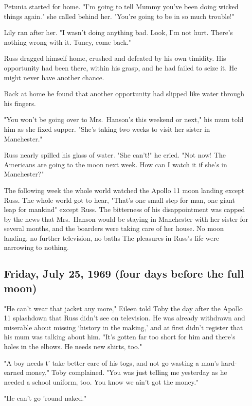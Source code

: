 Petunia started for home. "I'm going to tell Mummy you've been doing wicked things again." she called behind her. "You're going to be in so much trouble!"

Lily ran after her. "I wasn't doing anything bad. Look, I'm not hurt. There's nothing wrong with it. Tuney, come back."

Russ dragged himself home, crushed and defeated by his own timidity. His opportunity had been there, within his grasp, and he had failed to seize it. He might never have another chance.

Back at home he found that another opportunity had slipped like water through his fingers.

"You won't be going over to Mrs.~Hanson's this weekend or next," his mum told him as she fixed supper. "She's taking two weeks to visit her sister in Manchester."

Russ nearly spilled his glass of water. "She can't!" he cried. "Not now! The Americans are going to the moon next week. How can I watch it if she's in Manchester?"

The following week the whole world watched the Apollo 11 moon landing except Russ. The whole world got to hear, "That's one small step for man, one giant leap for mankind" except Russ. The bitterness of his disappointment was capped by the news that Mrs.~Hanson would be staying in Manchester with her sister for several months, and the boarders were taking care of her house. No moon landing, no further television, no baths{\el} The pleasures in Russ's life were narrowing to nothing.

\subsection{Friday, July 25, 1969 (four days before the full moon)}

"He can't wear that jacket any more," Eileen told Toby the day after the Apollo 11 splashdown that Russ didn't see on television. He was already withdrawn and miserable about missing `history in the making,' and at first didn't register that his mum was talking about him. "It's gotten far too short for him and there's holes in the elbows. He needs new shirts, too."

"A boy needs t' take better care of his togs, and not go wasting a man's hard-earned money," Toby complained. "You was just telling me yesterday as he needed a school uniform, too. You know we ain't got the money."

"He can't go 'round naked."

